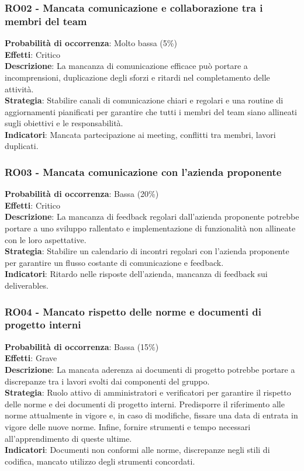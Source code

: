 \documentclass[a4paper,12pt]{article}
\begin{document}
\subsubsection{RO02 - Mancata comunicazione e collaborazione tra i membri del team}
\label{RO02}
\textbf{Probabilità di occorrenza}: Molto bassa (5\%)\\
\textbf{Effetti}: Critico\\
\textbf{Descrizione}: La mancanza di comunicazione efficace può portare a incomprensioni, duplicazione degli sforzi e ritardi nel completamento delle attività.\\
\textbf{Strategia}: Stabilire canali di comunicazione chiari e regolari e una routine di aggiornamenti pianificati per garantire che tutti i membri del team siano allineati sugli obiettivi e le responsabilità.\\
\textbf{Indicatori}: Mancata partecipazione ai meeting, conflitti tra membri, lavori duplicati.

\subsubsection{RO03 - Mancata comunicazione con l'azienda proponente}
\label{RO03}
\textbf{Probabilità di occorrenza}: Bassa (20\%)\\
\textbf{Effetti}: Critico\\
\textbf{Descrizione}: La mancanza di feedback regolari dall'azienda proponente potrebbe portare a uno sviluppo rallentato e implementazione di funzionalità non allineate con le loro aspettative.\\
\textbf{Strategia}: Stabilire un calendario di incontri regolari con l'azienda proponente per garantire un flusso costante di comunicazione e feedback.\\
\textbf{Indicatori}: Ritardo nelle risposte dell'azienda, mancanza di feedback sui deliverables.

\subsubsection{RO04 - Mancato rispetto delle norme e documenti di progetto interni}
\label{RO04}
\textbf{Probabilità di occorrenza}: Bassa (15\%)\\
\textbf{Effetti}: Grave\\
\textbf{Descrizione}: La mancata aderenza ai documenti di progetto potrebbe portare a discrepanze tra i lavori svolti dai componenti del gruppo.\\
\textbf{Strategia}: Ruolo attivo di amministratori e verificatori per garantire il rispetto delle norme e dei documenti di progetto interni. Predisporre il riferimento alle norme attualmente in vigore e, in caso di modifiche, fissare una data di entrata in vigore delle nuove norme. Infine, fornire strumenti e tempo necessari all'apprendimento di queste ultime.\\
\textbf{Indicatori}: Documenti non conformi alle norme, discrepanze negli stili di codifica, mancato utilizzo degli strumenti concordati.
\end{document}

